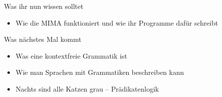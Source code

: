 {}{

\begin{frame}	
	\begin{block}{Was ihr nun wissen solltet}
		\begin{itemize}
			\item Wie die MIMA funktioniert und wie ihr Programme dafür schreibt

		\end{itemize}
	\end{block}
	
	\begin{block}{Was nächstes Mal kommt}
		\begin{itemize}
			\item Was eine kontextfreie Grammatik ist
			\item Wie man Sprachen mit Grammatiken beschreiben kann
			\item Nachts sind alle Katzen grau -- Prädikatenlogik
		\end{itemize}
	\end{block}
\end{frame}	

}

\ifnum{} 
\else
\fi


\slideThanks

